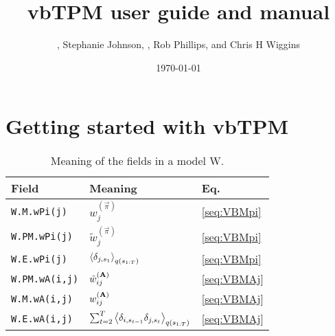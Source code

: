 \documentclass[11pt,letterpaper,twocolumn]{article}
\title{vbTPM user guide and manual}
\author{\ml{Martin Lind\'en}, Stephanie Johnson, \jwm{Jan-Willem van
    de Meent}, Rob Phillips, and Chris H Wiggins}
\date{\today}
\newcommand{\vbparbox}[1]{\parbox[t]{0.4\columnwidth}{
    \rule[5pt]{0pt}{5pt} #1 \rule[-3pt]{0pt}{5pt}}}
\begin{document}
\maketitle
\tableofcontents

\section{Getting started with vbTPM}

\begin{table}
\caption{Meaning of the fields in a model W. }
  \begin{tabular}{|l|l|l|}
    \hline
    Field & Meaning & Eq.\\
    \hline\hline

    \verb+W.M.wPi(j)+& $ w_j^{(\vec{\pi})}$    & \eqref{seq:VBMpi}\\ \hline
    \verb+W.PM.wPi(j)+& $\tilde w_j^{(\vec{\pi})}$    & \eqref{seq:VBMpi}\\ \hline
    \verb+W.E.wPi(j)+& $\left\langle \delta_{j,s_1}\right\rangle_{q(s_{1:T})}$ & \eqref{seq:VBMpi}\\ 
    \hline
    
    \verb+W.PM.wA(i,j)+& $\tilde w_{ij}^{(\mathbf{A})}$& \eqref{seq:VBMAj}\\ \hline
    \verb+W.M.wA(i,j)+& $w_{ij}^{(\mathbf{A})}$& \eqref{seq:VBMAj}\\ \hline
    \verb+W.E.wA(i,j)+& $\sum_{t=2}^T\left\langle \delta_{i,s_{t-1}}\delta_{j,s_t}\right\rangle_{q(s_{1:T})}$
    & \eqref{seq:VBMAj}\\ 
    \hline


\end{tabular}
\end{table}
\end{document}
